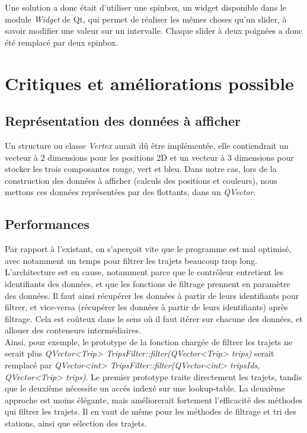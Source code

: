 \documentclass[12pt]{article}
\begin{document}
		Une solution a donc était d’utiliser une spinbox, un widget disponible dans le module \textit{Widget} de Qt, qui permet de réaliser les mêmes choses qu’un slider, à savoir modifier une valeur sur un intervalle. Chaque slider à deux poignées a donc été remplacé par deux spinbox.
	
	\newpage
	\section{Critiques et améliorations possible} \label{ameliorations}	
		\subsection{Représentation des données à afficher} 
		Un structure ou classe \textit{Vertex} aurait dû être implémentée, elle contiendrait un vecteur
		à 2 dimensions pour les positions 2D et un vecteur à 3 dimensions pour stocker les trois
		composantes rouge, vert et bleu.
		Dans notre cas,
		lors de la construction des données à afficher (calculs des positions et couleurs), nous
		mettons ces données représentées par des flottants, dans un \textit{QVector}.
	
		\subsection{Performances}
		Par rapport à l’existant, on s'aperçoit vite que le programme est mal optimisé, avec notamment un temps pour filtrer les trajets beaucoup trop long.\\
	
		L’architecture est en cause, notamment parce que le contrôleur entretient les identifiants des données, et que les fonctions de filtrage prennent en paramètre des données. Il faut ainsi récupérer les données à partir de leurs identifiants pour filtrer, et vice-versa (récupérer les données à partir de leurs identifiants) après filtrage. Cela est coûteux dans le sens où il faut itérer sur chacune des données, et allouer des conteneurs intermédiaires.\\
		
		Ainsi, pour exemple, le prototype de la fonction chargée de filtrer les trajets ne serait plus
\textit{QVector<Trip> TripsFilter::filter(QVector<Trip> trips)} serait remplacé par 
\textit{QVector<int> TripsFilter::filter(QVector<int> tripsIds, QVector<Trip> trips)}. Le premier prototype traite directement les trajets, tandis que le deuxième nécessite un accés indexé sur une lookup-table. La deuxième approche est moins élégante, mais améliorerait fortement l’efficacité des méthodes qui filtrer les trajets. Il en vaut de même pour les méthodes de filtrage et tri des stations, ainsi que sélection des trajets.\\
	
\end{document}
